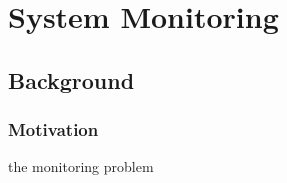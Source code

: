 \chapter{System Monitoring}

\section{Background}

\subsection{Motivation}
the monitoring problem






